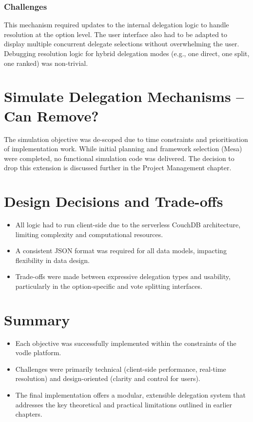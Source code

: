 \subsubsection{Challenges}
This mechanism required updates to the internal delegation logic to handle resolution at the option level. The user interface also had to be adapted to display multiple concurrent delegate selections without overwhelming the user. Debugging resolution logic for hybrid delegation modes (e.g., one direct, one split, one ranked) was non-trivial.

\section{Simulate Delegation Mechanisms -- Can Remove?}
The simulation objective was de-scoped due to time constraints and prioritisation of implementation work. While initial planning and framework selection (Mesa) were completed, no functional simulation code was delivered. The decision to drop this extension is discussed further in the Project Management chapter.

\section{Design Decisions and Trade-offs}
\begin{itemize}
  \item All logic had to run client-side due to the serverless CouchDB architecture, limiting complexity and computational resources.
  \item A consistent JSON format was required for all data models, impacting flexibility in data design.
  \item Trade-offs were made between expressive delegation types and usability, particularly in the option-specific and vote splitting interfaces.
\end{itemize}

\section{Summary}
\begin{itemize}
  \item Each objective was successfully implemented within the constraints of the vodle platform.
  \item Challenges were primarily technical (client-side performance, real-time resolution) and design-oriented (clarity and control for users).
  \item The final implementation offers a modular, extensible delegation system that addresses the key theoretical and practical limitations outlined in earlier chapters.
\end{itemize}

